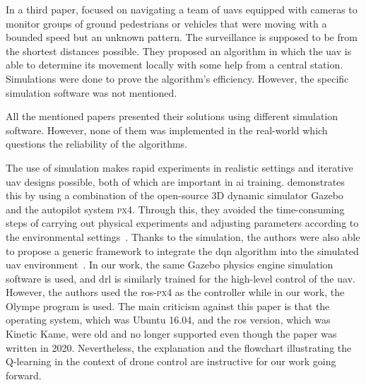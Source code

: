\documentclass[../main.tex]{subfiles}
\begin{document}
		In a third paper, \citeauthor{hua21} focused on navigating a team
		of \glspl{uav} equipped with cameras to monitor groups of ground 
		pedestrians or vehicles that were moving with a bounded speed but an unknown pattern. 
		The surveillance is supposed to be from the shortest distances possible. 
		They proposed an algorithm in which the \gls{uav} is able to determine 
		its movement locally with some help from a central station.
		Simulations were done to prove the algorithm's efficiency. However, the 
		specific simulation software was not mentioned. 
		
		All the mentioned papers presented their solutions using different 
		simulation software. However, none of them was implemented in the real-world which questions the reliability of the algorithms.


The use of simulation makes rapid experiments in realistic settings 
and iterative \gls{uav} designs possible, 
both of which are important in \gls{ai} training. 
\citeauthor{Zho20} demonstrates this by %
using a combination of the open-source 3D dynamic simulator Gazebo
and the autopilot system \textsc{px}4.
Through this, they avoided the time-consuming steps of 
carrying out physical experiments
and adjusting parameters according 
to the environmental settings~\cite{Zho20}.
Thanks to the simulation, 
the authors were also able to propose a generic
framework to integrate the \gls{dqn} algorithm into 
the simulated \gls{uav} environment~\cite{Zho20}.
In our work, the same Gazebo physics engine
simulation software is used, and \gls{drl} is similarly trained
for the high-level control of the \gls{uav}. 
However, the authors used the \gls{ros}-\textsc{px}4 as the controller 
while in our work, the Olympe program is used.
The main criticism against this paper is that the operating system,
which was Ubuntu 16.04, and 
the \gls{ros} version, which was Kinetic Kame, 
were old and no longer supported 
even though the paper was written in 2020.
Nevertheless, the explanation and the flowchart illustrating the 
Q-learning in the context of drone control are instructive 
for our work going forward.
\end{document}
